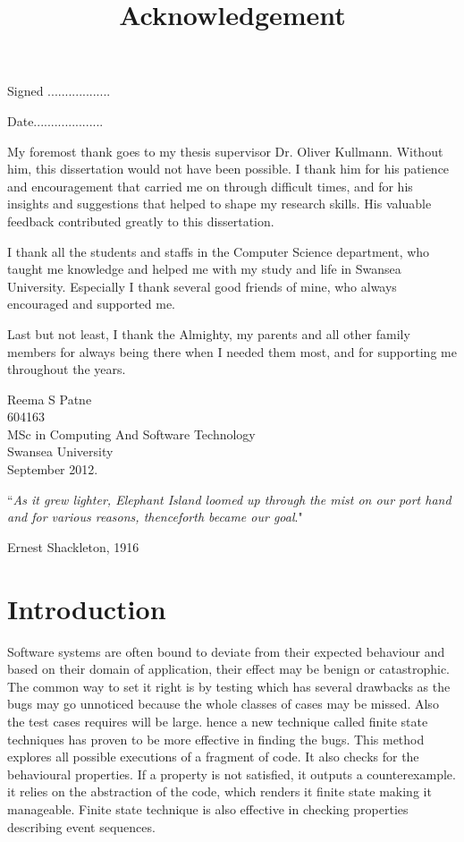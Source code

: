 \documentclass[a4paper,10pt]{report}
\begin{document}
\begin{flushleft}Signed ..................\end{flushleft} 
\begin{flushright}Date....................\end{flushright}                                                                                                                                               \clearpage
\begin{center}
\title {Acknowledgement}
\end{center}
My foremost thank goes to my thesis supervisor Dr. Oliver Kullmann. Without him, this dissertation would not have been possible. I thank him for his patience and encouragement that carried me on through difficult times, and for his insights and suggestions that helped to shape my research skills. His valuable feedback contributed greatly to this dissertation.

I thank all the students and staffs in the Computer Science department, who taught me knowledge and helped me with my study and life in Swansea University. Especially I thank several good friends of mine, who always encouraged and supported me.

 Last but not least, I thank the Almighty, my parents and all other family members for always being there when I needed them most, and for supporting me throughout the years.
\begin{flushright}
Reema S Patne\\
604163\\
MSc in Computing And Software Technology\\
Swansea University\\
September 2012.
\end{flushright}
 \clearpage
 ``\textit{As it grew lighter, Elephant Island loomed up through the mist on our port hand
and for various reasons, thenceforth became our goal}."
\begin{flushright}
Ernest Shackleton, 1916
\end{flushright}

\tableofcontents

\chapter{Introduction}
\label{Intro}
Software systems are often bound to deviate from their expected behaviour and based on their domain of application, their effect may be benign or catastrophic. The common way to set it right is by testing which has several drawbacks as the bugs may go unnoticed because the whole classes of cases may be missed. Also the test cases requires will be large. hence a new technique called finite state techniques has proven to be more effective in finding the bugs. This method explores all possible executions of a fragment of code. It also checks for the behavioural properties. If a property is not satisfied, it outputs a counterexample. it relies on the abstraction of the code, which renders it finite state making it manageable. Finite state technique is also effective in checking properties describing event sequences\cite{Vaziri-Farahani2004}. 
\end{document}
